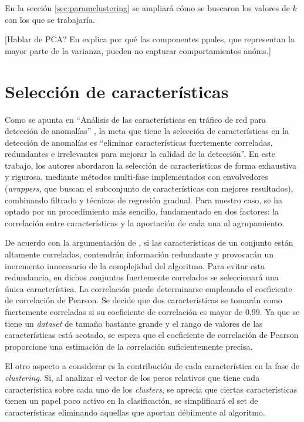 En la sección \ref{sec:paramclustering} se ampliará cómo se buscaron los valores de $k$ con los que se trabajaría.

[Hablar de PCA? En \cite{Bohara_2016} explica por qué las componentes ppales, que representan la mayor parte de la varianza, pueden no capturar comportamientos anóms.]

\section{Selección de características}\label{sec:selecciondecaracteristicas}

Como se apunta en ``Análisis de las características en tráfico de red para detección de anomalías'' \cite{Iglesias_2015},
la meta que tiene la selección de características en la detección de anomalías es
``eliminar características fuertemente correladas, redundantes e irrelevantes para mejorar la calidad de la detección''.
En este trabajo, los autores abordaron la selección de características de forma exhaustiva y rigurosa,
mediante métodos multi-fase implementados con envolvedores (\emph{wrappers}, que buscan el subconjunto de características con mejores resultados),
combinando filtrado y técnicas de regresión gradual.
Para nuestro caso, se ha optado por un procedimiento más sencillo, fundamentado en dos factores: la correlación entre características y la aportación de cada una al agrupamiento.

De acuerdo con la argumentación de \cite{Bohara_2016}, si las características de un conjunto están altamente correladas,
contendrán información redundante y provocarán un incremento innecesario de la complejidad del algoritmo.
Para evitar esta redundancia, en dichos conjuntos fuertemente correlados se seleccionará una única característica.
La correlación puede determinarse empleando el coeficiente de correlación de Pearson.
Se decide que dos características se tomarán como fuertemente correladas si su coeficiente de correlación es mayor de 0,99.
Ya que se tiene un \emph{dataset} de tamaño bastante grande y el rango de valores de las características está acotado,
se espera que el coeficiente de correlación de Pearson proporcione una estimación de la correlación suficientemente precisa.

El otro aspecto a considerar es la contribución de cada característica en la fase de \emph{clustering}.
Si, al analizar el vector de los pesos relativos que tiene cada característica sobre cada uno de los \emph{clusters},
se aprecia que ciertas características tienen un papel poco activo en la clasificación,
se simplificará el set de características eliminando aquellas que aportan débilmente al algoritmo.

